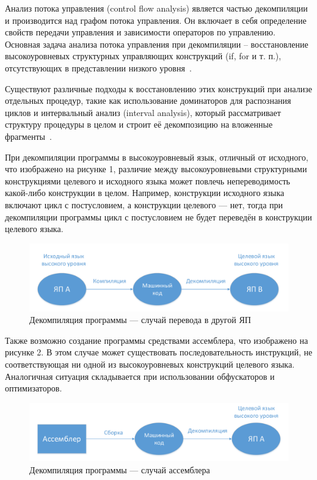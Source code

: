 Анализ потока управления (control flow analysis) является частью декомпиляции и производится над графом потока управления. Он включает в себя определение свойств передачи управления и зависимости операторов по управлению. Основная задача анализа потока управления при декомпиляции – восстановление высокоуровневых структурных управляющих конструкций (if, for и т. п.), отсутствующих в представлении низкого уровня~\cite{reengineering}. 

Существуют различные подходы к восстановлению этих конструкций при анализе отдельных процедур, такие как использование доминаторов для распознания циклов и интервальный анализ (interval analysis), который рассматривает структуру процедуры в целом и строит её декомпозицию на вложенные фрагменты~\cite{controlflow}.


При декомпиляции программы в высокоуровневый язык, отличный от исходного, что изображено на рисунке 1, различие между высокоуровневыми структурными конструкциями целевого и исходного языка может повлечь непереводимость какой-либо конструкции в целом. Например, конструкции исходного языка включают цикл с постусловием, а конструкции целевого --- нет, тогда при декомпиляции программы цикл с постусловием не будет переведён в конструкции целевого языка.

\begin{figure}[H]
\includegraphics[width=1\linewidth]{Zabransky/gr1.pdf} 
\caption{Декомпиляция программы --- случай перевода в другой ЯП}
\end{figure}

Также возможно создание программы средствами ассемблера, что изображено на рисунке 2. В этом случае может существовать последовательность инструкций, не соответствующая ни одной из высокоуровневых конструкций целевого языка. Аналогичная ситуация складывается при использовании обфускаторов и оптимизаторов.

\begin{figure}[H]
\includegraphics[width=1\linewidth]{Zabransky/gr2.pdf} 
\caption{Декомпиляция программы --- случай ассемблера}
\end{figure}

